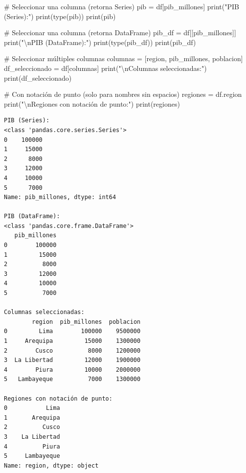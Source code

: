 \documentclass[
  doc,
  floatsintext,
  longtable,
  a4paper,
  nolmodern,
  notxfonts,
  notimes,
  12pt,
  colorlinks=true,linkcolor=blue,citecolor=blue,urlcolor=blue]{apa7}
\newenvironment{Shaded}{\begin{snugshade}}{\end{snugshade}}
\newcommand{\BuiltInTok}[1]{\textcolor[rgb]{0.00,0.23,0.31}{#1}}
\newcommand{\CharTok}[1]{\textcolor[rgb]{0.13,0.47,0.30}{#1}}
\newcommand{\CommentTok}[1]{\textcolor[rgb]{0.37,0.37,0.37}{#1}}
\newcommand{\NormalTok}[1]{\textcolor[rgb]{0.00,0.23,0.31}{#1}}
\newcommand{\OperatorTok}[1]{\textcolor[rgb]{0.37,0.37,0.37}{#1}}
\newcommand{\StringTok}[1]{\textcolor[rgb]{0.13,0.47,0.30}{#1}}
\begin{document}
\begin{Shaded}
\begin{Highlighting}[]
\CommentTok{\# Seleccionar una columna (retorna Series)}
\NormalTok{pib }\OperatorTok{=}\NormalTok{ df[}\StringTok{\textquotesingle{}pib\_millones\textquotesingle{}}\NormalTok{]}
\BuiltInTok{print}\NormalTok{(}\StringTok{"PIB (Series):"}\NormalTok{)}
\BuiltInTok{print}\NormalTok{(}\BuiltInTok{type}\NormalTok{(pib))}
\BuiltInTok{print}\NormalTok{(pib)}

\CommentTok{\# Seleccionar una columna (retorna DataFrame)}
\NormalTok{pib\_df }\OperatorTok{=}\NormalTok{ df[[}\StringTok{\textquotesingle{}pib\_millones\textquotesingle{}}\NormalTok{]]}
\BuiltInTok{print}\NormalTok{(}\StringTok{"}\CharTok{\textbackslash{}n}\StringTok{PIB (DataFrame):"}\NormalTok{)}
\BuiltInTok{print}\NormalTok{(}\BuiltInTok{type}\NormalTok{(pib\_df))}
\BuiltInTok{print}\NormalTok{(pib\_df)}

\CommentTok{\# Seleccionar múltiples columnas}
\NormalTok{columnas }\OperatorTok{=}\NormalTok{ [}\StringTok{\textquotesingle{}region\textquotesingle{}}\NormalTok{, }\StringTok{\textquotesingle{}pib\_millones\textquotesingle{}}\NormalTok{, }\StringTok{\textquotesingle{}poblacion\textquotesingle{}}\NormalTok{]}
\NormalTok{df\_seleccionado }\OperatorTok{=}\NormalTok{ df[columnas]}
\BuiltInTok{print}\NormalTok{(}\StringTok{"}\CharTok{\textbackslash{}n}\StringTok{Columnas seleccionadas:"}\NormalTok{)}
\BuiltInTok{print}\NormalTok{(df\_seleccionado)}

\CommentTok{\# Con notación de punto (solo para nombres sin espacios)}
\NormalTok{regiones }\OperatorTok{=}\NormalTok{ df.region}
\BuiltInTok{print}\NormalTok{(}\StringTok{"}\CharTok{\textbackslash{}n}\StringTok{Regiones con notación de punto:"}\NormalTok{)}
\BuiltInTok{print}\NormalTok{(regiones)}
\end{Highlighting}
\end{Shaded}

\begin{verbatim}
PIB (Series):
<class 'pandas.core.series.Series'>
0    100000
1     15000
2      8000
3     12000
4     10000
5      7000
Name: pib_millones, dtype: int64

PIB (DataFrame):
<class 'pandas.core.frame.DataFrame'>
   pib_millones
0        100000
1         15000
2          8000
3         12000
4         10000
5          7000

Columnas seleccionadas:
        region  pib_millones  poblacion
0         Lima        100000    9500000
1     Arequipa         15000    1300000
2        Cusco          8000    1200000
3  La Libertad         12000    1900000
4        Piura         10000    2000000
5   Lambayeque          7000    1300000

Regiones con notación de punto:
0           Lima
1       Arequipa
2          Cusco
3    La Libertad
4          Piura
5     Lambayeque
Name: region, dtype: object
\end{verbatim}
\end{document}
